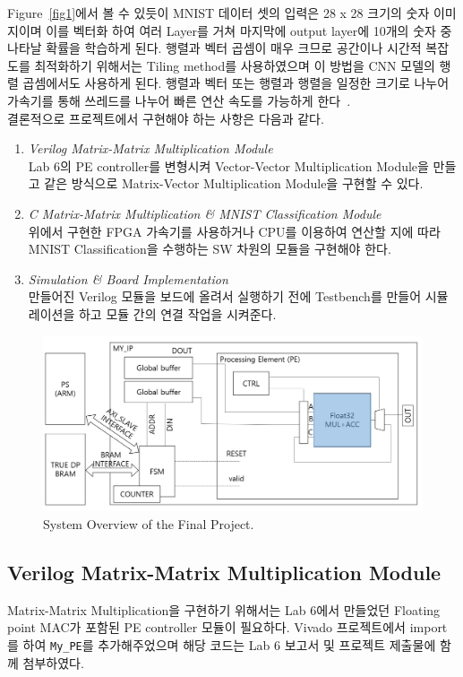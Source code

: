 \documentclass{article}
\begin{document}
Figure~\ref{fig1}에서 볼 수 있듯이 MNIST 데이터 셋의 입력은 28 x 28 크기의 숫자 이미지이며 이를 벡터화 하여 여러 Layer를 거쳐 마지막에 output layer에 10개의 숫자 중 나타날 확률을 학습하게 된다. 행렬과 벡터 곱셈이 매우 크므로 공간이나 시간적 복잡도를 최적화하기 위해서는 Tiling method를 사용하였으며 이 방법을 CNN 모델의 행렬 곱셈에서도 사용하게 된다. 행렬과 벡터 또는 행렬과 행렬을 일정한 크기로 나누어 가속기를 통해 쓰레드를 나누어 빠른 연산 속도를 가능하게 한다~\cite{lab9}. \\

\newpage
결론적으로 프로젝트에서 구현해야 하는 사항은 다음과 같다.
\begin{enumerate}
    \item \textit{Verilog Matrix-Matrix Multiplication Module}\\
    Lab 6의 PE controller를 변형시켜 Vector-Vector Multiplication Module을 만들고 같은 방식으로 Matrix-Vector Multiplication Module을 구현할 수 있다.
    \item \textit{C Matrix-Matrix Multiplication \& MNIST Classification Module}\\
    위에서 구현한 FPGA 가속기를 사용하거나 CPU를 이용하여 연산할 지에 따라 MNIST Classification을 수행하는 SW 차원의 모듈을 구현해야 한다. 
    \item \textit{Simulation \& Board Implementation} \\
    만들어진 Verilog 모듈을 보드에 올려서 실행하기 전에 Testbench를 만들어 시뮬레이션을 하고 모듈 간의 연결 작업을 시켜준다.
\end{enumerate}

\begin{figure}[htb!]
	\centering
	\includegraphics[width=1\textwidth]{fig/overview.png}
\caption{System Overview of the Final Project.}
\label{fig2}
\end{figure}

\subsection{Verilog Matrix-Matrix Multiplication Module}
\label{sec:mm}
Matrix-Matrix Multiplication을 구현하기 위해서는 Lab 6에서 만들었던 Floating point MAC가 포함된 PE controller 모듈이 필요하다. Vivado 프로젝트에서 import를 하여 \texttt{My\_PE}를 추가해주었으며 해당 코드는 Lab 6 보고서 및 프로젝트 제출물에 함께 첨부하였다. \\
\end{document}
